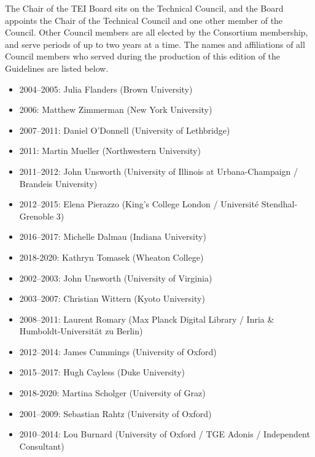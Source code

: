 The Chair of the TEI Board sits on the Technical Council, and the Board appoints the Chair of the Technical Council and one other member of the Council. Other Council members are all elected by the Consortium membership, and serve periods of up to two years at a time. The names and affiliations of all Council members who served during the production of this edition of the Guidelines are listed below.  \begin{itemize}
\item 2004–2005: Julia Flanders (Brown University)
\item 2006: Matthew Zimmerman (New York University)
\item 2007–2011: Daniel O'Donnell (University of Lethbridge)
\item 2011: Martin Mueller (Northwestern University)
\item 2011–2012: John Unsworth (University of Illinois at Urbana-Champaign / Brandeis University)
\item 2012–2015: Elena Pierazzo (King's College London / Université Stendhal-Grenoble 3)
\item 2016–2017: Michelle Dalmau (Indiana University)
\item 2018-2020: Kathryn Tomasek (Wheaton College)
\end{itemize}   \begin{itemize}
\item 2002–2003: John Unsworth (University of Virginia)
\item 2003–2007: Christian Wittern (Kyoto University)
\item 2008–2011: Laurent Romary (Max Planck Digital Library / Inria \& Humboldt-Universität zu Berlin)
\item 2012–2014: James Cummings (University of Oxford)
\item 2015–2017: Hugh Cayless (Duke University)
\item 2018-2020: Martina Scholger (University of Graz)
\end{itemize}   \begin{itemize}
\item 2001–2009: Sebastian Rahtz (University of Oxford)
\item 2010–2014: Lou Burnard (University of Oxford / TGE Adonis / Independent Consultant)
\end{itemize}   \begin{itemize}

\end{itemize}
